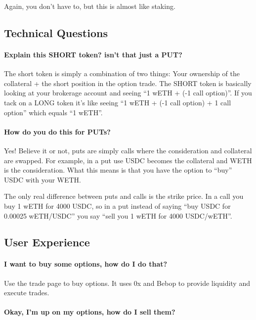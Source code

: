 \documentclass[%
 reprint,
 amsmath,amssymb,
 aps,
]{revtex4-2}
\begin{document}
Again, you don't have to, but this is almost like staking.

\subsection{Technical Questions}

\paragraph{Explain this SHORT token? isn't that just a PUT?}

The short token is simply a combination of two things: Your ownership of
the collateral + the short position in the option trade. The SHORT token
is basically looking at your brokerage account and seeing ``1 wETH + (-1
call option)''. If you tack on a LONG token it's like seeing ``1 wETH +
(-1 call option) + 1 call option'' which equals ``1 wETH''.

\paragraph{How do you do this for PUTs?}

Yes! Believe it or not, puts are simply calls where the consideration and
collateral are swapped. For example, in a put use USDC becomes the
collateral and WETH is the consideration. What this means is that you
have the option to ``buy'' USDC with your WETH.

The only real difference between puts and calls is the strike price. In
a call you buy 1 wETH for 4000 USDC, so in a put instead of saying ``buy
USDC for 0.00025 wETH/USDC'' you say ``sell you 1 wETH for 4000
USDC/wETH''.

\subsection{User Experience}

\paragraph{I want to buy some options, how do I do that?}

Use the trade page to buy options. It uses 0x and Bebop to provide
liquidity and execute trades.

\paragraph{Okay, I'm up on my options, how do I sell them?}
\end{document}
